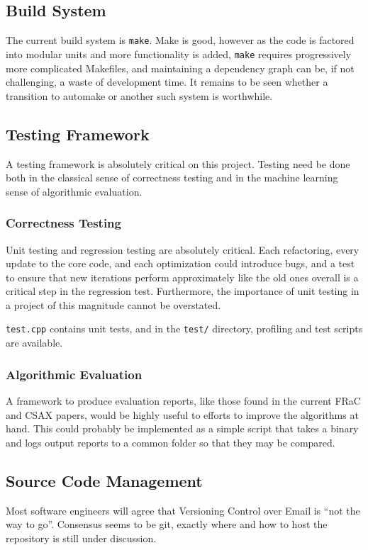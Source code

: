 \documentclass{article}
\newcommand{\filename}[1]{\texttt{\color{filename}#1}}
\begin{document}
\begin{multicols}{2}

\subsection{Build System}

The current build system is \texttt{make}.  Make is good, however as the code is factored into modular units and more functionality is added, \texttt{make} requires progressively more complicated Makefiles, and maintaining a dependency graph can be, if not challenging, a waste of development time.  It remains to be seen whether a transition to automake or another such system is worthwhile.

\subsection{Testing Framework}

A testing framework is absolutely critical on this project.  Testing need be done both in the classical sense of correctness testing and in the machine learning sense of algorithmic evaluation.

\subsubsection{Correctness Testing}

Unit testing and regression testing are absolutely critical.  Each refactoring, every update to the core code, and each optimization could introduce bugs, and a test to ensure that new iterations perform approximately like the old ones overall is a critical step in the regression test.  Furthermore, the importance of unit testing in a project of this magnitude cannot be overstated.

\filename{test.cpp} contains unit tests, and in the \filename{test/} directory, profiling and test scripts are available. 

\subsubsection{Algorithmic Evaluation}

A framework to produce evaluation reports, like those found in the current FRaC and CSAX papers, would be highly useful to efforts to improve the algorithms at hand.  This could probably be implemented as a simple script that takes a binary and logs output reports to a common folder so that they may be compared.

\subsection{Source Code Management}

Most software engineers will agree that Versioning Control over Email is ``not the way to go''.  Consensus seems to be git, exactly where and how to host the repository is still under discussion.  


\end{multicols}

\nocite{csax, csaxJournal, FRaC10, FRaC12, huang, lof}


\end{document}
